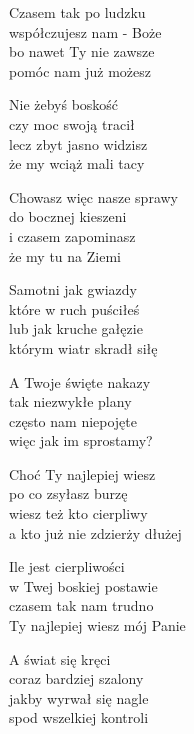 \begin{text}
    Czasem tak po ludzku\\
    współczujesz nam - Boże\\
    bo nawet Ty nie zawsze\\
    pomóc nam już możesz

    Nie żebyś boskość\\
    czy moc swoją tracił\\
    lecz zbyt jasno widzisz\\
    że my wciąż mali tacy

    \vin Chowasz więc nasze sprawy\\
    \vin do bocznej kieszeni\\
    \vin i czasem zapominasz\\
    \vin że my tu na Ziemi

    Samotni jak gwiazdy\\
    które w ruch puściłeś\\
    lub jak kruche gałęzie\\
    którym wiatr skradł siłę

    \vin A Twoje święte nakazy\\
    \vin tak niezwykłe plany\\
    \vin często nam niepojęte\\
    \vin więc jak im sprostamy?

    Choć Ty najlepiej wiesz\\
    po co zsyłasz burzę\\
    wiesz też kto cierpliwy\\
    a kto już nie zdzierży dłużej

    Ile jest cierpliwości\\
    w Twej boskiej postawie\\
    czasem tak nam trudno\\
    Ty najlepiej wiesz mój Panie

    \vin A świat się kręci\\
    \vin coraz bardziej szalony\\
    \vin jakby wyrwał się nagle\\
    \vin spod wszelkiej kontroli
\end{text}
